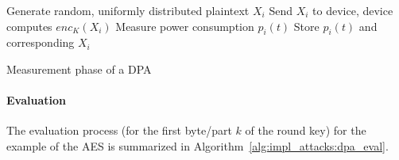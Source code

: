 \begin{algorithm}
\center
\begin{algorithmic}
\vspace{2mm}

	\State Generate random, uniformly distributed plaintext $X_i$
	\State Send $X_i$ to device, device computes $enc_K \left(X_i \right)$
	\State Measure power consumption $p_i\left(t\right)$
	\State Store $p_i\left(t\right)$ and corresponding $X_i$
\EndFor

\vspace{2mm}
\end{algorithmic}
\caption{Measurement phase of a \ac{DPA}}
\label{alg:impl_attacks:dpa_measure}
\end{algorithm}

\paragraph{Evaluation}


The evaluation process (for the first byte/part $k$ of the round key) for the example of the \ac{AES} is summarized in Algorithm~\ref{alg:impl_attacks:dpa_eval}.

